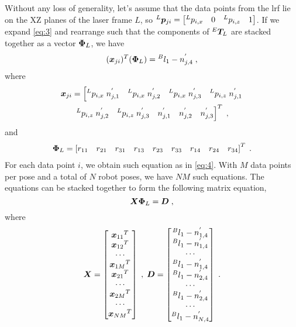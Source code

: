 Without any loss of generality, let's assume that the data points from the \ac{lrf} lie on the XZ planes of the laser frame $L$, so ${^L}\vb*{p}_{ji} = \left[{^L}p_{i,x} \quad 0 \quad {^L}p_{i,z}\quad 1\right]$. If we expand \eqref{eq:3} and rearrange such that the components of ${^E}\vb*{T}_L$ are stacked together as a vector $\vb*{\Phi}_L$, we have
\begin{equation}
\label{eq:4}
  (\vb*{x}_{ji})  ^T (\vb*{\Phi}_L) = {^B}l_1 -  n^{'}_{j,4} \; , 
\end{equation}
where 
\begin{multline}
  \vb*{x}_{ji} = \left[{^L}p_{i,x}\;n^{'}_{j,1} \quad {^L}p_{i,x}\;n^{'}_{j,2}\quad {^L}p_{i,x}\;n^{'}_{j,3}\quad  {^L}p_{i,z}\;n^{'}_{j,1}\right. \\ 
\left. {^L}p_{i,z}\;n^{'}_{j,2}\quad {^L}p_{i,z}\;n^{'}_{j,3} \quad n^{'}_{j,1} \quad n^{'}_{j,2} \quad n^{'}_{j,3} \right]^T \; , 
\end{multline}
and
\begin{multline}
  \vb*{\Phi}_L= \left[r_{11} \quad r_{21} \quad r_{31} \quad r_{13} \quad r_{23} \quad r_{33} \quad r_{14} \quad r_{24}  \quad r_{34} \right] ^T \; .
\end{multline}
For each data point $i$, we obtain such equation as in \eqref{eq:4}. With $M$ data points per pose and a total of $N$ robot poses, we have $NM$ such equations. The equations can be stacked together to form the following matrix equation,
\begin{equation}
\label{eq:7}
  \vb*{X}   \vb*{\Phi}_L= \vb*{D} \; ,
\end{equation}
where 
\begin{equation}
\vb*{X} =\begin{bmatrix}
{\vb*{x}_{11}}^T \\ {\vb*{x}_{12}}^T  \\ \cdots\\{\vb*{x}_{1M}}^T \\ {\vb*{x}_{21}}^T \\ \cdots\\ {\vb*{x}_{2M}}^T  \\ \cdots \\ {\vb*{x}_{NM}}^T 
\end{bmatrix} \;, \; \vb*{D} =\begin{bmatrix}
{^B}l_1 -  n^{'}_{1,4} \\ {^B}l_1 -  n^{'}_{1,4}  \\ \cdots\\ {^B}l_1 -  n^{'}_{1,4}  \\ {^B}l_1 -  n^{'}_{2,4} \\ \cdots\\ {^B}l_1 -  n^{'}_{2,4}  \\ \cdots \\{^B}l_1 -  n^{'}_{N,4}  
\end{bmatrix}  \; .
\end{equation}
